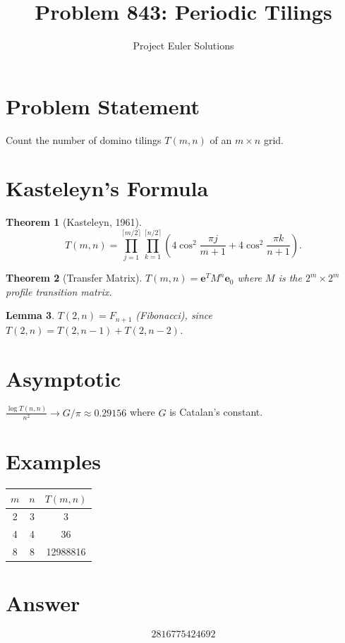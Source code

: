 \documentclass[11pt]{article}
\title{Problem 843: Periodic Tilings}
\author{Project Euler Solutions}
\date{}
\newtheorem{theorem}{Theorem}
\newtheorem{lemma}[theorem]{Lemma}
\begin{document}
\maketitle

\section{Problem Statement}
Count the number of domino tilings $T(m,n)$ of an $m \times n$ grid.

\section{Kasteleyn's Formula}

\begin{theorem}[Kasteleyn, 1961]
\[
T(m,n) = \prod_{j=1}^{\lceil m/2\rceil}\prod_{k=1}^{\lceil n/2\rceil}\left(4\cos^2\frac{\pi j}{m+1} + 4\cos^2\frac{\pi k}{n+1}\right).
\]
\end{theorem}

\begin{theorem}[Transfer Matrix]
$T(m,n) = \mathbf{e}^T M^n \mathbf{e}_0$ where $M$ is the $2^m \times 2^m$ profile transition matrix.
\end{theorem}

\begin{lemma}
$T(2,n) = F_{n+1}$ (Fibonacci), since $T(2,n) = T(2,n-1) + T(2,n-2)$.
\end{lemma}

\section{Asymptotic}
$\frac{\log T(n,n)}{n^2} \to G/\pi \approx 0.29156$ where $G$ is Catalan's constant.

\section{Examples}
\begin{center}
\begin{tabular}{ccc}
\toprule $m$ & $n$ & $T(m,n)$ \\ \midrule
2 & 3 & 3 \\ 4 & 4 & 36 \\ 8 & 8 & 12988816 \\ \bottomrule
\end{tabular}
\end{center}

\section{Answer}

\[
\boxed{2816775424692}
\]
\end{document}

